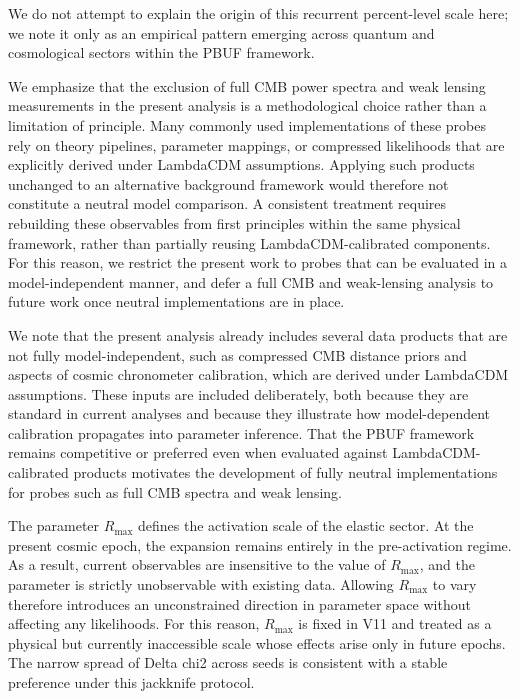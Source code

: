 \documentclass[11pt]{article}
\begin{document}
We do not attempt to explain the origin of this recurrent percent-level scale here; we note it only as an empirical pattern emerging across quantum and cosmological sectors within the PBUF framework.

We emphasize that the exclusion of full CMB power spectra and weak lensing measurements in the present analysis is a methodological choice rather than a limitation of principle. Many commonly used implementations of these probes rely on theory pipelines, parameter mappings, or compressed likelihoods that are explicitly derived under LambdaCDM assumptions. Applying such products unchanged to an alternative background framework would therefore not constitute a neutral model comparison. A consistent treatment requires rebuilding these observables from first principles within the same physical framework, rather than partially reusing LambdaCDM-calibrated components. For this reason, we restrict the present work to probes that can be evaluated in a model-independent manner, and defer a full CMB and weak-lensing analysis to future work once neutral implementations are in place.

We note that the present analysis already includes several data products that are not fully model-independent, such as compressed CMB distance priors and aspects of cosmic chronometer calibration, which are derived under LambdaCDM assumptions. These inputs are included deliberately, both because they are standard in current analyses and because they illustrate how model-dependent calibration propagates into parameter inference. That the PBUF framework remains competitive or preferred even when evaluated against LambdaCDM-calibrated products motivates the development of fully neutral implementations for probes such as full CMB spectra and weak lensing.

The parameter \(R_{\max}\) defines the activation scale of the elastic sector.
At the present cosmic epoch, the expansion remains entirely in the pre-activation regime.
As a result, current observables are insensitive to the value of \(R_{\max}\), and the parameter is strictly unobservable with existing data.
Allowing \(R_{\max}\) to vary therefore introduces an unconstrained direction in parameter space without affecting any likelihoods.
For this reason, \(R_{\max}\) is fixed in V11 and treated as a physical but currently inaccessible scale whose effects arise only in future epochs.
The narrow spread of Delta chi2 across seeds is consistent with a stable preference under this jackknife protocol.
\end{document}
